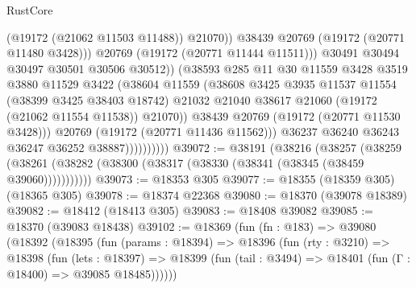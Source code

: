\begin{lexlean}{RustCore}
\begin{coremodule}
                                      (@19172 (@21062 @11503 @11488))
                                      @21070))
                                  @38439
                                  @20769
                                  (@19172 (@20771 @11480 @3428)))
                                @20769
                                (@19172 (@20771 @11444 @11511)))
                              @30491
                              @30494
                              @30497
                              @30501
                              @30506
                              @30512))
                          (@38593
                            @285
                            @11
                            @30
                            @11559
                            @3428
                            @3519
                            @3880
                            @11529
                            @3422
                            (@38604
                              @11559
                              (@38608
                                @3425
                                @3935
                                @11537
                                @11554
                                (@38399 @3425 @38403 @18742)
                                @21032
                                @21040
                                @38617
                                @21060
                                (@19172 (@21062 @11554 @11538))
                                @21070))
                            @38439
                            @20769
                            (@19172 (@20771 @11530 @3428)))
                          @20769
                          (@19172 (@20771 @11436 @11562)))
                        @36237
                        @36240
                        @36243
                        @36247
                        @36252
                        @38887))))))))))
@39072 := @38191
    (@38216
      (@38257
        (@38259 (@38261 (@38282 (@38300 (@38317 (@38330 (@38341 (@38345 (@38459 @39060)))))))))))
@39073 := @18353 @305
@39077 := @18355 (@18359 @305) (@18365 @305)
@39078 := @18374 @22368
@39080 := @18370 (@39078 @18389)
@39082 := @18412 (@18413 @305)
@39083 := @18408 @39082
@39085 := @18370 (@39083 @18438)
@39102 := @18369
    (fun (fn : @183) =>
    @39080
      (@18392
        (@18395
          (fun (params : @18394) =>
          @18396
            (fun (rty : @3210) =>
            @18398
              (fun (lets : @18397) =>
              @18399 (fun (tail : @3494) => @18401 (fun (Γ : @18400) => @39085 @18485))))))

\end{coremodule}
\end{lexlean}
